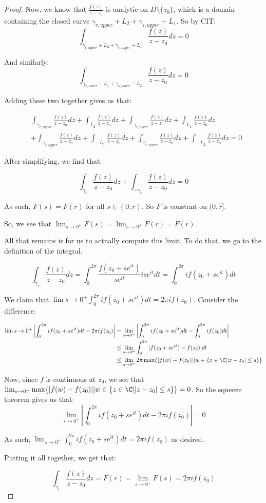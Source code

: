 \begin{proof}
Now, we know that $\frac{f(z)}{z-z_0}$ is analytic on $D\setminus \{z_0\}$, which is a domain containing the closed curve $\gamma_{r,upper} + L_2 + \gamma_{s,upper} + L_1$. So by CIT:
$$\int_{\gamma_{r,upper} + L_2 + \gamma_{s,upper} + L_1} \frac{f(z)}{z-z_0}dz = 0$$

And similarly:
$$\int_{\gamma_{r,lower} - L_1 + \gamma_{s,lower} - L_2} \frac{f(z)}{z-z_0}dz = 0$$

Adding these two together gives us that:

\begin{align*}&\int_{\gamma_{r,upper}} \frac{f(z)}{z-z_0} dz + \int_{L_2} \frac{f(z)}{z-z_0} dz + \int_{\gamma_{r,lower}} \frac{f(z)}{z-z_0} dz + \int_{L_1} \frac{f(z)}{z-z_0} dz \\
&+\int_{\gamma_{s,upper}} \frac{f(z)}{z-z_0} dz + \int_{-L_1} \frac{f(z)}{z-z_0} dz + \int_{\gamma_{s,lower}} \frac{f(z)}{z-z_0} dz + \int_{-L_2} \frac{f(z)}{z-z_0} dz  = 0\end{align*}

After simplifying, we find that:

$$\int_{\gamma_{r}} \frac{f(z)}{z-z_0} dz + \int_{-\gamma_{s}} \frac{f(z)}{z-z_0}dz = 0$$

As such, $F(s) = F(r)$ for all $s \in (0,r)$. So $F$ is constant on $(0,r]$.

So, we see that $\lim_{s\rightarrow 0^+} F(s) = \lim_{s\rightarrow 0^+}F(r) = F(r)$.

All that remains is for us to actually compute this limit. To do that, we go to the definition of the integral.

$$\int_{\gamma_s} \frac{f(z)}{z-z_0}dz = \int_0^{2\pi} \frac{f(z_0 + se^{it})}{se^{it}}ise^{it}dt = \int_0^{2\pi} if(z_0 + se^{it})dt$$

We claim that $\lim{s\rightarrow 0^+} \int_0^{2\pi} if(z_0 + se^{it})dt =2\pi i f(z_0)$. Consider the difference:

\begin{align*}\lim{s\rightarrow 0^+} \left|\int_0^{2\pi} if(z_0 + se^{it})dt - 2\pi i f(z_0)\right| &= \lim_{s\rightarrow 0^+} \left|\int_0^{2\pi} if(z_0 + se^{it})dt - \int_0^{2\pi} if(z_0)dt\right|\\
&\le \lim_{s\rightarrow 0^+} \int_0^{2\pi} |f(z_0 + se^{it}) - f(z_0)|dt\\
&\le \lim_{s\rightarrow 0^+} 2\pi \max\{|f(w) - f(z_0)|| w\in \{z\in\C||z-z_0|\le s\}\}
\end{align*}

Now, since $f$ is continuous at $z_0$, we see that  $\lim_{s\rightarrow 0^+}\max\{|f(w) - f(z_0)|| w\in \{z\in\C||z-z_0|\le s\}\} = 0$. So the squeeze theorem gives us that:
$$\lim_{s\rightarrow 0^+} \left|\int_0^{2\pi} if(z_0 + se^{it})dt - 2\pi i f(z_0)\right| = 0$$

As such, $\lim_{s\rightarrow 0^+} \int_0^{2\pi} if(z_0 + se^{it})dt =2\pi i f(z_0)$ as desired.

Putting it all together, we get that:

$$\int_{\gamma_r} \frac{f(z)}{z-z_0}dz = F(r) = \lim_{s\rightarrow 0^+} F(s) = 2\pi i f(z_0)$$

\end{proof}

